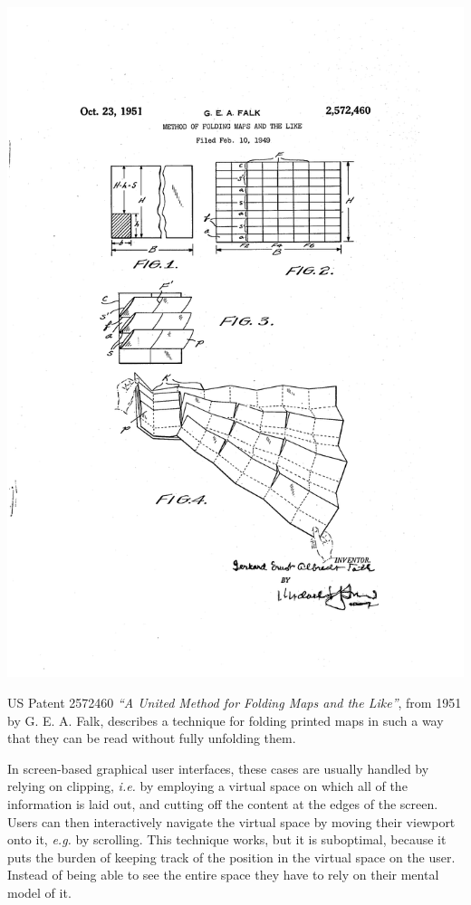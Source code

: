 \documentclass{tufte-book} %
\newcommand{\hairsp}{\hspace{1pt}} %
\newcommand{\ie}{\textit{i.\hairsp{}e.}\xspace} %
\newcommand{\eg}{\textit{e.\hairsp{}g.}\xspace} %
\begin{document}
\begin{marginfigure}
\includegraphics[width=\linewidth]{falk-patent.png}
\caption{US Patent 2572460 \emph{``A United Method for Folding Maps and the Like''}, from 1951 by G. E. A. Falk, describes a technique for folding printed maps in such a way that they can be read without fully unfolding them.}
\label{fig:falkmap}
\end{marginfigure}

In screen-based graphical user interfaces, these cases are usually handled by relying on clipping, \ie by employing a virtual space on which all of the information is laid out, and cutting off the content at the edges of the screen. Users can then interactively navigate the virtual space by moving their viewport onto it, \eg by scrolling. This technique works, but it is suboptimal, because it puts the burden of keeping track of the position in the virtual space on the user. Instead of being able to see the entire space they have to rely on their mental model of it.
\end{document}
